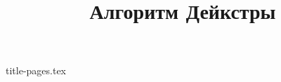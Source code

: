 \documentclass[9pt, letterpaper, twocolumn]{article}
\title{Алгоритм Дейкстры}
\date{\vspace{-5ex}}
\begin{document}
{title-pages.tex}




\end{document}
